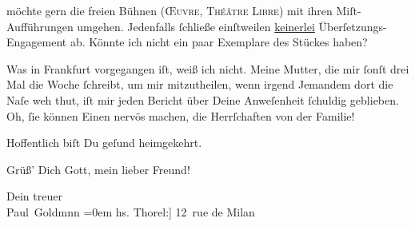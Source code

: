                möchte gern  die freien Bühnen (\textsc{Œuvre}, \textsc{Théâtre Libre}) mit ihren Miſt-Aufführungen umgehen. Jedenfalls{ }ſchließe einſtweilen \uline{keinerlei} Überſetzungs-Engagement ab. Könnte ich nicht
               ein paar Exemplare des Stückes
               haben?\pend
           
\pstart
           Was in Frankfurt vorgegangen iſt, weiß ich nicht.
               Meine Mutter, die mir{ }ſonſt
               drei Mal die Woche{ }ſchreibt, um {\pb}mir mitzutheilen,
               wenn irgend Jemandem dort die Naſe weh thut, iſt mir jeden Bericht über Deine
               Anweſenheit{ }ſchuldig geblieben. Oh,{ }ſie können Einen nervös machen, die Herrſchaften
               von der Familie!\pend
           
\pstart
           Hoffentlich biſt Du geſund heimgekehrt.\pend
           
\pstart
           Grüß’ Dich Gott, mein lieber Freund!\pend
           
\pstart
           Dein treuer {\\[\baselineskip]}\spacefill\mbox{Paul Goldmnn}\pend
           \leftskip=0em{}\vspace{1em}{\vspace{1\baselineskip}}
\pstart
           \raggedleft{}{\pb}{[}hs. Thorel:{]} 12 rue de Milan\pend
           
